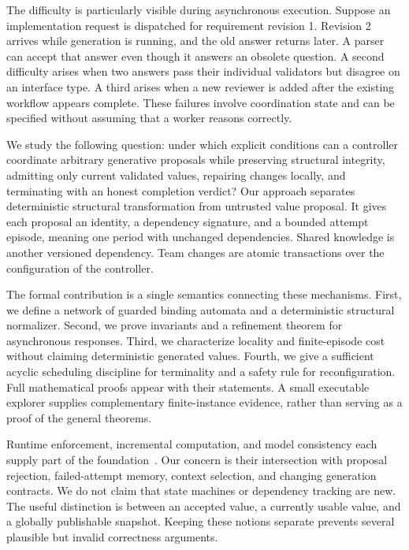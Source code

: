 \documentclass[pdflatex,sn-mathphys-num]{sn-jnl}
\theoremstyle{thmstyleone}
\theoremstyle{thmstylethree}
\theoremstyle{thmstyletwo}
\begin{document}
The difficulty is particularly visible during asynchronous execution. Suppose an implementation request is dispatched for requirement revision 1. Revision 2 arrives while generation is running, and the old answer returns later. A parser can accept that answer even though it answers an obsolete question. A second difficulty arises when two answers pass their individual validators but disagree on an interface type. A third arises when a new reviewer is added after the existing workflow appears complete. These failures involve coordination state and can be specified without assuming that a worker reasons correctly.

We study the following question: under which explicit conditions can a controller coordinate arbitrary generative proposals while preserving structural integrity, admitting only current validated values, repairing changes locally, and terminating with an honest completion verdict? Our approach separates deterministic structural transformation from untrusted value proposal. It gives each proposal an identity, a dependency signature, and a bounded attempt episode, meaning one period with unchanged dependencies. Shared knowledge is another versioned dependency. Team changes are atomic transactions over the configuration of the controller.

The formal contribution is a single semantics connecting these mechanisms. First, we define a network of guarded binding automata and a deterministic structural normalizer. Second, we prove invariants and a refinement theorem for asynchronous responses. Third, we characterize locality and finite-episode cost without claiming deterministic generated values. Fourth, we give a sufficient acyclic scheduling discipline for terminality and a safety rule for reconfiguration. Full mathematical proofs appear with their statements. A small executable explorer supplies complementary finite-instance evidence, rather than serving as a proof of the general theorems.

Runtime enforcement, incremental computation, and model consistency each supply part of the foundation~\cite{schneider,acar,mokhov,stevens}. Our concern is their intersection with proposal rejection, failed-attempt memory, context selection, and changing generation contracts. We do not claim that state machines or dependency tracking are new. The useful distinction is between an accepted value, a currently usable value, and a globally publishable snapshot. Keeping these notions separate prevents several plausible but invalid correctness arguments.
\end{document}
